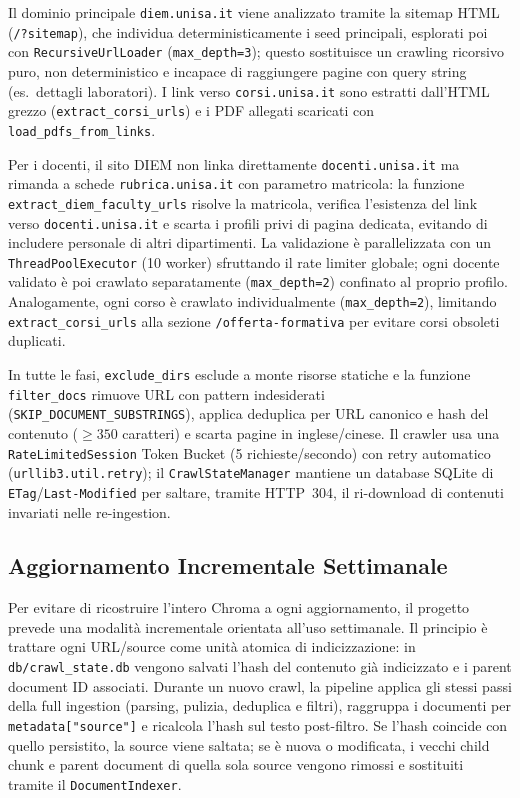 \documentclass[11pt,a4paper]{article}
\newcommand{\code}[1]{\texttt{\small#1}}
\begin{document}
Il dominio principale \texttt{diem.unisa.it} viene analizzato tramite la sitemap HTML
(\texttt{/?sitemap}), che individua deterministicamente i seed principali, esplorati poi con
\code{RecursiveUrlLoader} (\code{max\_depth=3}); questo sostituisce un crawling ricorsivo
puro, non deterministico e incapace di raggiungere pagine con query string (es.\ dettagli
laboratori). I link verso \texttt{corsi.unisa.it} sono estratti dall'HTML grezzo
(\code{extract\_corsi\_urls}) e i PDF allegati scaricati con \code{load\_pdfs\_from\_links}.

Per i docenti, il sito DIEM non linka direttamente \texttt{docenti.unisa.it} ma rimanda a
schede \texttt{rubrica.unisa.it} con parametro matricola: la funzione
\code{extract\_diem\_faculty\_urls} risolve la matricola, verifica l'esistenza del link verso
\texttt{docenti.unisa.it} e scarta i profili privi di pagina dedicata, evitando di includere
personale di altri dipartimenti. La validazione è parallelizzata con un
\code{ThreadPoolExecutor} (10 worker) sfruttando il rate limiter globale; ogni docente
validato è poi crawlato separatamente (\code{max\_depth=2}) confinato al proprio profilo.
Analogamente, ogni corso è crawlato individualmente (\code{max\_depth=2}), limitando
\code{extract\_corsi\_urls} alla sezione \texttt{/offerta-formativa} per evitare corsi
obsoleti duplicati.

In tutte le fasi, \code{exclude\_dirs} esclude a monte risorse statiche e la funzione
\code{filter\_docs} rimuove URL con pattern indesiderati (\code{SKIP\_DOCUMENT\_SUBSTRINGS}),
applica deduplica per URL canonico e hash del contenuto ($\ge 350$ caratteri) e scarta
pagine in inglese/cinese. Il crawler usa una \code{RateLimitedSession} Token Bucket
(5 richieste/secondo) con retry automatico (\code{urllib3.util.retry}); il
\code{CrawlStateManager} mantiene un database SQLite di \texttt{ETag}/\texttt{Last-Modified}
per saltare, tramite HTTP~304, il ri-download di contenuti invariati nelle re-ingestion.

\subsection{Aggiornamento Incrementale Settimanale}
\label{sec:incremental-update}

Per evitare di ricostruire l'intero Chroma a ogni aggiornamento, il progetto prevede una
modalità incrementale orientata all'uso settimanale. Il principio è trattare ogni URL/source
come unità atomica di indicizzazione: in \code{db/crawl\_state.db} vengono salvati l'hash
del contenuto già indicizzato e i parent document ID associati. Durante un nuovo crawl, la
pipeline applica gli stessi passi della full ingestion (parsing, pulizia, deduplica e
filtri), raggruppa i documenti per \code{metadata["source"]} e ricalcola l'hash sul testo
post-filtro. Se l'hash coincide con quello persistito, la source viene saltata; se è nuova o
modificata, i vecchi child chunk e parent document di quella sola source vengono rimossi e
sostituiti tramite il \code{DocumentIndexer}.
\end{document}
